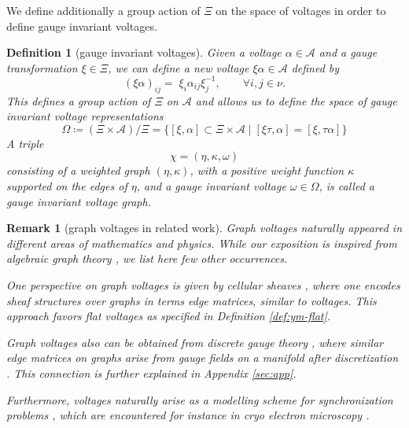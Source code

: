 \documentclass[10pt,reqno]{amsart}
\numberwithin{equation}{section}
\theoremstyle{bfnote}
\theoremstyle{bfdef}
\newtheorem{definition}[theorem]{Definition}
\newtheorem{remark}[theorem]{Remark}
\newcommand{\mc}[1]{\mathcal{#1}}
\providecommand\gt; %
\renewcommand{\gt}{\xi}
\providecommand\a; %
\renewcommand{\a}{\alpha}
\providecommand\gtt; %
\renewcommand{\gtt}{\tau}
\begin{document}
		We define additionally a group action of $\Xi$ on the space of voltages in order to define gauge invariant voltages.
		\begin{definition}[gauge invariant voltages]
			Given a voltage $\a \in \mc{A}$ and a gauge transformation $\gt \in \Xi$, we can define a new voltage $\gt \a \in \mc{A}$ defined by
			\begin{equation}\label{def-action-Xi-A}
				(\xi\alpha)_{ij}=\; \gt_i \a_{ij} \gt_j^{-1}, \qquad \forall i,j \in \nu.
			\end{equation}
			This defines a group action of $\Xi$ on $\mc{A}$ and allows us to define the space of \textit{gauge invariant voltage representations}
			\begin{equation}
				\Omega \coloneqq (\Xi \times \mc{A}) / \Xi = \{[\gt,\a] \subset \Xi \times \mc{A} \mid [\gt \gtt ,\a] = [\gt,\gtt \a]\}
			\end{equation}
			A triple
			\begin{equation}
				\chi = (\eta,\kappa,\omega)
			\end{equation}
			consisting of a weighted graph $(\eta,\kappa)$, with a positive weight function $\kappa$ supported on the edges of $\eta$, and a gauge invariant voltage $\omega\in\Omega$, is called a \textit{gauge invariant voltage graph}.
		\end{definition}

		\begin{remark}[graph voltages in related work]\label{rem:graph-voltage-related}
			Graph voltages naturally appeared in different areas of mathematics and physics. While our exposition is inspired from algebraic graph theory \cite{grossTopologicalGraphTheory1987}, we list here few other occurrences.

			One perspective on graph voltages is given by \textit{cellular sheaves} \cite{hansenSpectralTheoryCellular2019a,hansenOpinionDynamicsDiscourse2021,bodnarNeuralSheafDiffusion2023}, where one encodes sheaf structures over graphs in terms edge matrices, similar to voltages. This approach favors \textit{flat voltages} as specified in Definition \ref{def:ym-flat}.

			Graph voltages also can be obtained from \textit{discrete gauge theory} \cite{baezSpinNetworkStates1996,Gattringer:2010zz,jiangGaugeTheoryGraphs2023}, where similar edge matrices on graphs arise from \textit{gauge fields on a manifold} after discretization \cite{leokDiscreteTheoryConnections2005}. This connection is further explained in Appendix \ref{sec:app}.

			Furthermore, voltages naturally arise as a modelling scheme for \textit{synchronization problems} \cite{gaoGeometrySynchronizationProblems2019}, which are encountered for instance in cryo electron microscopy \cite{singerViewingAngleClassification2011,shkolnisky2012viewing}.
		\end{remark}
\end{document}
